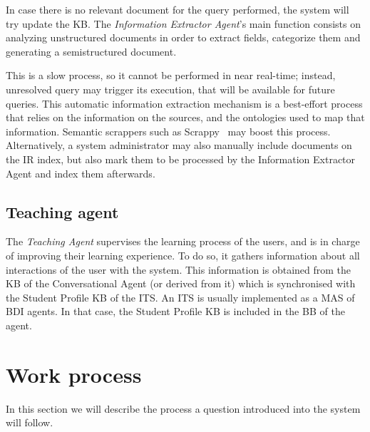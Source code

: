 In case there is no relevant document for the query performed, the system will try update the KB. The {\em Information Extractor Agent}'s main function consists on analyzing unstructured documents in order to extract fields, categorize them and generating a semistructured document. 

This is a slow process, so it cannot be performed in near real-time; instead, unresolved query may trigger its execution, that will be available for future queries. 
This automatic information extraction mechanism is a best-effort process that relies on the information on the sources, and the ontologies used to map that information. Semantic scrappers such as Scrappy~\cite{villamor13} may boost this process.
Alternatively, a system administrator may also manually include documents on the \ac{IR} index, but also mark them to be processed by the Information Extractor Agent and index them afterwards.

\subsection{Teaching agent}

The {\em Teaching Agent} supervises the learning process of the users, and is in charge of improving their learning experience.
To do so, it  gathers information about all interactions of the user with the system. This information is obtained from the \ac{KB} of the Conversational Agent (or derived from it) which is synchronised with the Student Profile KB of the \ac{ITS}.
An \ac{ITS} is usually implemented as a \ac{MAS} of \ac{BDI} agents. In that case, the Student Profile KB is included in the \ac{BB} of the agent. 

%
\section{Work process} %

In this section we will describe the process a question introduced into the system will follow. %

% 
